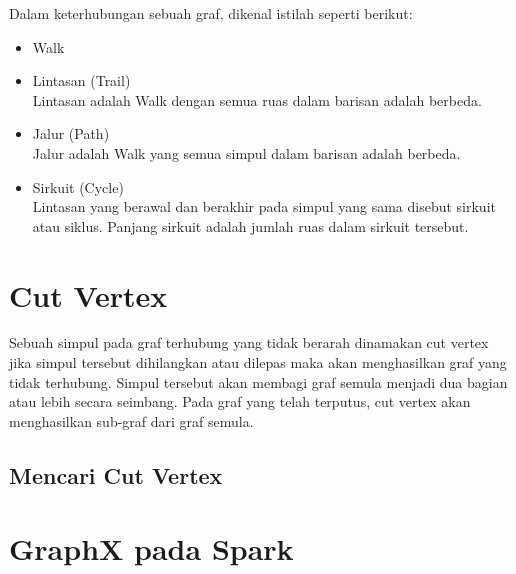Dalam keterhubungan sebuah graf, dikenal istilah seperti berikut:
\begin{itemize}
\item Walk


\item Lintasan (Trail)\\
Lintasan adalah Walk dengan semua ruas dalam barisan adalah berbeda.


\item Jalur (Path)\\
Jalur adalah Walk yang semua simpul dalam barisan adalah berbeda.


\item Sirkuit (Cycle)\\
Lintasan yang berawal dan berakhir pada simpul yang sama disebut sirkuit atau
siklus. Panjang sirkuit adalah jumlah ruas dalam sirkuit tersebut.
\end{itemize}





\section{Cut Vertex}
\label{sec:cut vertex}

Sebuah simpul pada graf terhubung yang tidak berarah dinamakan cut vertex jika simpul tersebut dihilangkan atau dilepas maka akan menghasilkan graf yang tidak terhubung. Simpul tersebut akan membagi graf semula menjadi dua bagian atau lebih secara seimbang.
Pada graf yang telah terputus, cut vertex akan menghasilkan sub-graf dari graf semula.

\subsection{Mencari Cut Vertex}




\section{GraphX pada Spark}
\label{sec:template}
 


